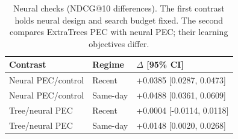 \begin{table}[!htbp]
\renewcommand{\arraystretch}{1.10}
\caption{Neural checks (NDCG@10 differences). The first contrast holds neural design and search budget fixed. The second compares ExtraTrees PEC with neural PEC; their learning objectives differ.}
\label{tab:neural}
\centering
\small
\setlength{\tabcolsep}{3pt}
\begin{tabular*}{\linewidth}{@{\extracolsep{\fill}}lll@{}}
\toprule
Contrast & Regime & $\Delta$ [95\% CI] \\
\midrule
Neural PEC/control & Recent & +0.0385 [0.0287, 0.0473] \\
Neural PEC/control & Same-day & +0.0488 [0.0361, 0.0609] \\
Tree/neural PEC & Recent & +0.0004 [-0.0114, 0.0118] \\
Tree/neural PEC & Same-day & +0.0148 [0.0020, 0.0268] \\
\bottomrule
\end{tabular*}
\end{table}
